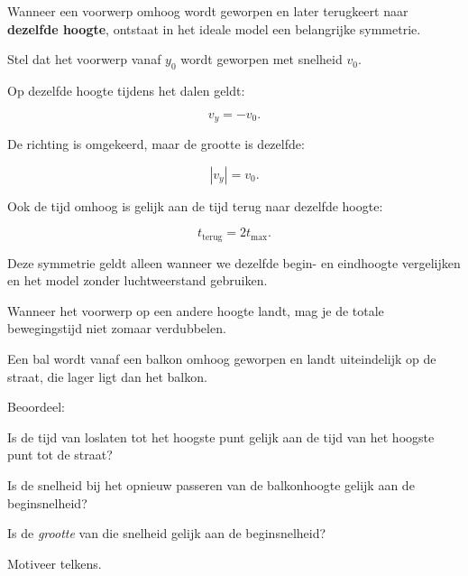 \documentclass{ximera}
\begin{document}


Wanneer een voorwerp omhoog wordt geworpen en later terugkeert naar
\textbf{dezelfde hoogte}, ontstaat in het ideale model een belangrijke
symmetrie.

Stel dat het voorwerp vanaf $y_0$ wordt geworpen met snelheid $v_0$.

Op dezelfde hoogte tijdens het dalen geldt:

\[
v_y=-v_0.
\]

De richting is omgekeerd, maar de grootte is dezelfde:

\[
|v_y|=v_0.
\]

Ook de tijd omhoog is gelijk aan de tijd terug naar dezelfde hoogte:

\[
t_{\mathrm{terug}}=2t_{\max}.
\]

\begin{opmerking}

Deze symmetrie geldt alleen wanneer we dezelfde begin- en eindhoogte
vergelijken en het model zonder luchtweerstand gebruiken.

Wanneer het voorwerp op een andere hoogte landt, mag je de totale
bewegingstijd niet zomaar verdubbelen.

\end{opmerking}


\begin{oefening}{\oefU\ESS}

Een bal wordt vanaf een balkon omhoog geworpen en landt uiteindelijk
op de straat, die lager ligt dan het balkon.

Beoordeel:

\begin{question}
Is de tijd van loslaten tot het hoogste punt gelijk aan de tijd van
het hoogste punt tot de straat?
\end{question}

\begin{question}
Is de snelheid bij het opnieuw passeren van de balkonhoogte gelijk
aan de beginsnelheid?
\end{question}

\begin{question}
Is de \emph{grootte} van die snelheid gelijk aan de beginsnelheid?
\end{question}

Motiveer telkens.

\end{oefening}
\end{document}
